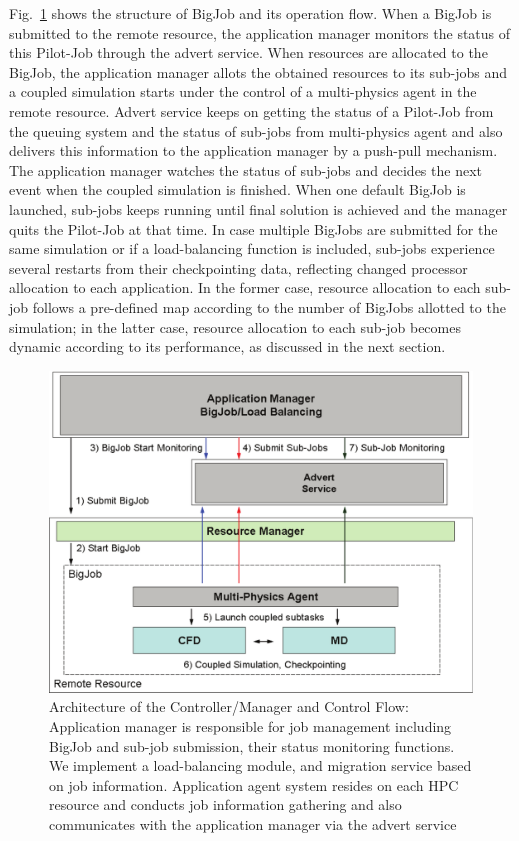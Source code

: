 \documentclass[preprint,12pt]{elsarticle}
\begin{document}
Fig.~\ref{Fig:BigJob_Structure} shows the structure of BigJob and its operation flow. When a BigJob is submitted to the remote resource, the application manager monitors the status of this Pilot-Job through the advert service. When resources are allocated to the BigJob, the application manager allots the obtained resources to its sub-jobs and a coupled simulation starts under the control of a multi-physics agent in the remote resource. Advert service keeps on getting the status of a Pilot-Job from the queuing system and the status of sub-jobs from multi-physics agent and also delivers this information to the application manager by a push-pull mechanism. The application manager watches the status of sub-jobs and decides the next event when the coupled simulation is finished. When one default BigJob is launched, sub-jobs keeps running until final solution is achieved and the manager quits the Pilot-Job at that time. In case multiple BigJobs are submitted for the same simulation or if a load-balancing function is included, sub-jobs experience several restarts from their checkpointing data, reflecting changed processor allocation to each application. In the former case, resource allocation to each sub-job follows a pre-defined map according to the number of BigJobs allotted to the simulation; in the latter case, resource allocation to each sub-job becomes dynamic according to its performance, as discussed in the next section.


\begin{figure}
\centering
\includegraphics[width=0.8\linewidth]{Structure_of_BigJob}
\caption{\small Architecture of the Controller/Manager and Control Flow: Application manager is responsible for job management including BigJob and sub-job submission, their status monitoring functions. We implement a load-balancing module, and migration service based on job information. Application agent system resides on each HPC resource and conducts job information gathering and also communicates with the application manager via the advert service}
\label{Fig:BigJob_Structure}
\vspace{-1em}
\end{figure}
\end{document}

